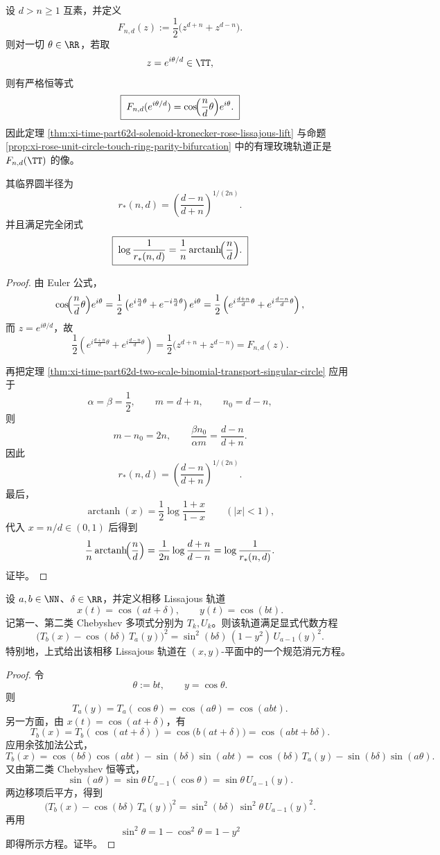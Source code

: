 \begin{corollary}[有理玫瑰轨道的二项式输运实现与隐藏临界圆半径]\label{cor:xi-time-part62d-rose-binomial-transport-hidden-radius}
设 \(d>n\ge 1\) 互素，并定义
\[
F_{n,d}(z):=\frac12\bigl(z^{d+n}+z^{d-n}\bigr).
\]
则对一切 \(\theta\in\RR\)，若取
\[
z=e^{i\theta/d}\in\TT,
\]
则有严格恒等式
\[
\boxed{\;
F_{n,d}(e^{i\theta/d})
=
\cos\!\Bigl(\frac{n}{d}\theta\Bigr)e^{i\theta}.\;}
\]
因此定理 \ref{thm:xi-time-part62d-solenoid-kronecker-rose-lissajous-lift} 与命题 \ref{prop:xi-rose-unit-circle-touch-ring-parity-bifurcation} 中的有理玫瑰轨道正是 \(F_{n,d}(\TT)\) 的像。

其临界圆半径为
\[
\boxed{\;
r_\ast(n,d)=
\left(\frac{d-n}{d+n}\right)^{1/(2n)}.\;}
\]
并且满足完全闭式
\[
\boxed{\;
\log\frac{1}{r_\ast(n,d)}
=
\frac{1}{n}\operatorname{arctanh}\!\Bigl(\frac{n}{d}\Bigr).\;}
\]
\end{corollary}
\begin{proof}
由 Euler 公式，
\[
\cos\!\Bigl(\frac{n}{d}\theta\Bigr)e^{i\theta}
=
\frac12
\left(
e^{i\frac{n}{d}\theta}+e^{-i\frac{n}{d}\theta}
\right)e^{i\theta}
=
\frac12
\left(
e^{i\frac{d+n}{d}\theta}+e^{i\frac{d-n}{d}\theta}
\right),
\]
而 \(z=e^{i\theta/d}\)，故
\[
\frac12
\left(
e^{i\frac{d+n}{d}\theta}+e^{i\frac{d-n}{d}\theta}
\right)
=
\frac12\bigl(z^{d+n}+z^{d-n}\bigr)
=
F_{n,d}(z).
\]

再把定理 \ref{thm:xi-time-part62d-two-scale-binomial-transport-singular-circle} 应用于
\[
\alpha=\beta=\frac12,
\qquad
m=d+n,
\qquad
n_0=d-n,
\]
则
\[
m-n_0=2n,
\qquad
\frac{\beta n_0}{\alpha m}=\frac{d-n}{d+n}.
\]
因此
\[
r_\ast(n,d)
=
\left(\frac{d-n}{d+n}\right)^{1/(2n)}.
\]
最后，
\[
\operatorname{arctanh}(x)=\frac12\log\frac{1+x}{1-x}
\qquad(|x|<1),
\]
代入 \(x=n/d\in(0,1)\) 后得到
\[
\frac{1}{n}\operatorname{arctanh}\!\Bigl(\frac{n}{d}\Bigr)
=
\frac{1}{2n}\log\frac{d+n}{d-n}
=
\log\frac{1}{r_\ast(n,d)}.
\]
证毕。
\end{proof}

\begin{theorem}\label{thm:xi-time-part62d-lissajous-chebyshev-implicit-equation}
设 \(a,b\in\NN\)、\(\delta\in\RR\)，并定义相移 Lissajous 轨道
\[
x(t)=\cos(at+\delta),
\qquad
y(t)=\cos(bt).
\]
记第一、第二类 Chebyshev 多项式分别为 \(T_k,U_k\)。则该轨道满足显式代数方程
\[
\boxed{\;
\bigl(T_b(x)-\cos(b\delta)\,T_a(y)\bigr)^2
=
\sin^2(b\delta)\,(1-y^2)\,U_{a-1}(y)^2.\;}
\]
特别地，上式给出该相移 Lissajous 轨道在 \((x,y)\)-平面中的一个规范消元方程。
\end{theorem}
\begin{proof}
令
\[
\theta:=bt,
\qquad
y=\cos\theta.
\]
则
\[
T_a(y)=T_a(\cos\theta)=\cos(a\theta)=\cos(abt).
\]
另一方面，由 \(x(t)=\cos(at+\delta)\)，有
\[
T_b(x)=T_b(\cos(at+\delta))
=
\cos\bigl(b(at+\delta)\bigr)
=
\cos(abt+b\delta).
\]
应用余弦加法公式，
\[
T_b(x)
=
\cos(b\delta)\cos(abt)-\sin(b\delta)\sin(abt)
=
\cos(b\delta)\,T_a(y)-\sin(b\delta)\sin(a\theta).
\]
又由第二类 Chebyshev 恒等式，
\[
\sin(a\theta)=\sin\theta\,U_{a-1}(\cos\theta)
=
\sin\theta\,U_{a-1}(y).
\]
两边移项后平方，得到
\[
\bigl(T_b(x)-\cos(b\delta)\,T_a(y)\bigr)^2
=
\sin^2(b\delta)\,\sin^2\theta\,U_{a-1}(y)^2.
\]
再用
\[
\sin^2\theta=1-\cos^2\theta=1-y^2
\]
即得所示方程。证毕。
\end{proof}

